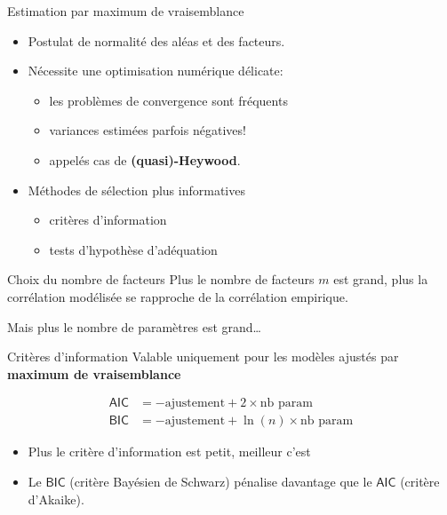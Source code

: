 \documentclass[
  ignorenonframetext,
]{beamer}
\providecommand{\tightlist}{%
  \setlength{\itemsep}{0pt}\setlength{\parskip}{0pt}}\usepackage{longtable,booktabs,array}
\begin{document}
\begin{frame}{Estimation par maximum de vraisemblance}
\protect\hypertarget{estimation-par-maximum-de-vraisemblance}{}
\begin{itemize}
\tightlist
\item
  Postulat de normalité des aléas et des facteurs.
\item
  Nécessite une optimisation numérique délicate:

  \begin{itemize}
  \tightlist
  \item
    les problèmes de convergence sont fréquents
  \item
    variances estimées parfois négatives!
  \item
    appelés cas de \textbf{(quasi)-Heywood}.
  \end{itemize}
\item
  Méthodes de sélection plus informatives

  \begin{itemize}
  \tightlist
  \item
    critères d'information
  \item
    tests d'hypothèse d'adéquation
  \end{itemize}
\end{itemize}
\end{frame}

\begin{frame}{Choix du nombre de facteurs}
\protect\hypertarget{choix-du-nombre-de-facteurs}{}
Plus le nombre de facteurs \(m\) est grand, plus la corrélation
modélisée se rapproche de la corrélation empirique.

Mais plus le nombre de paramètres est grand\ldots{}
\end{frame}

\begin{frame}{Critères d'information}
\protect\hypertarget{crituxe8res-dinformation}{}
Valable uniquement pour les modèles ajustés par \textbf{maximum de
vraisemblance}

\begin{align*}
\mathsf{AIC} &= -\text{ajustement} + 2\times\text{nb param} \\
\mathsf{BIC}&= -\text{ajustement} + \ln(n)\times\text{nb param}
\end{align*}

\begin{itemize}
\tightlist
\item
  Plus le critère d'information est petit, meilleur c'est
\item
  Le \(\mathsf{BIC}\) (critère Bayésien de Schwarz) pénalise davantage
  que le \(\mathsf{AIC}\) (critère d'Akaike).
\end{itemize}
\end{frame}
\end{document}
